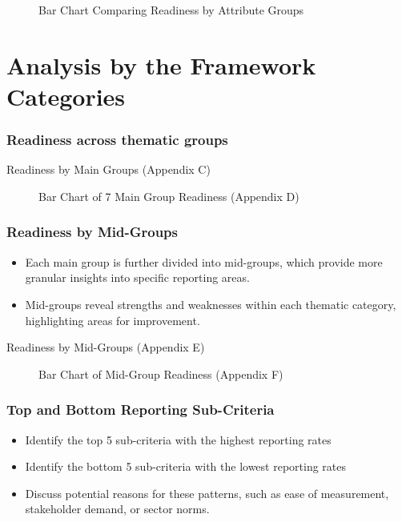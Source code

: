 \begin{figure}[H]
    \centering
    \caption{Bar Chart Comparing Readiness by Attribute Groups}
\end{figure}

\section{Analysis by the Framework Categories}
\subsubsection{Readiness across thematic groups}

\begin{table}[H]
    \centering
    \caption{Readiness by Main Groups (Appendix C)}
\end{table}

\begin{figure}[H]
    \centering
    \caption{Bar Chart of 7 Main Group Readiness (Appendix D)}
\end{figure}

\subsubsection{Readiness by Mid-Groups}
\begin{itemize}
    \item Each main group is further divided into mid-groups, which provide more granular insights into specific reporting areas.
    \item Mid-groups reveal strengths and weaknesses within each thematic category, highlighting areas for improvement.
\end{itemize}

\begin{table}[H]
    \centering
    \caption{Readiness by Mid-Groups (Appendix E)}
\end{table}

\begin{figure}[H]
    \centering
    \caption{Bar Chart of Mid-Group Readiness (Appendix F)}
\end{figure}

\subsubsection{Top and Bottom Reporting Sub-Criteria}
\begin{itemize}
    \item Identify the top 5 sub-criteria with the highest reporting rates
    \item Identify the bottom 5 sub-criteria with the lowest reporting rates
    \item Discuss potential reasons for these patterns, such as ease of measurement, stakeholder demand, or sector norms.
\end{itemize}

